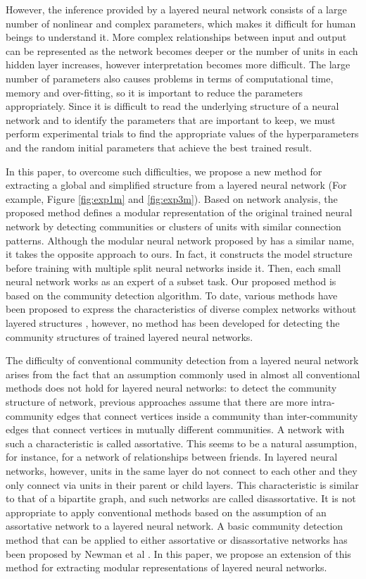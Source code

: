 \documentclass[12pt]{article} %
\begin{document}
However, the inference provided by a layered neural network consists of a large number of nonlinear and complex parameters, which makes it difficult for human beings to understand it. 
More complex relationships between input and output can be represented as the network becomes deeper or the number of units in each hidden layer increases, however interpretation becomes more difficult. The large number of parameters also causes problems in terms of computational time, memory and over-fitting, so it is important to reduce the parameters appropriately. 
Since it is difficult to read the underlying structure of a neural network and to identify the parameters that are important to keep, we must perform experimental trials to find the appropriate values of the hyperparameters and the random initial parameters that achieve the best trained result. 

In this paper, to overcome such difficulties, we propose a new method for extracting a global and simplified structure from a layered neural network (For example, Figure \ref{fig:exp1m} and \ref{fig:exp3m}). Based on network analysis, the proposed method defines a modular representation of the original trained neural network by detecting communities or clusters of units with similar connection patterns. 
Although the modular neural network proposed by \cite{Jacobs1991, Azam2000} has a similar name, it takes the opposite approach to ours. In fact, it constructs the model structure before training with multiple split neural networks inside it. Then, each small neural network works as an expert of a subset task. Our proposed method is based on the community detection algorithm. To date, various methods have been proposed to express the characteristics of diverse complex networks without layered structures \cite{Newman2004, Estrada2005, Newman2006, Meunier2006, Newman2007}, however, no method has been developed for detecting the community structures of trained layered neural networks. 

The difficulty of conventional community detection from a layered neural network arises from the fact that an assumption commonly used in almost all conventional methods does not hold for layered neural networks: to detect the community structure of network, previous approaches assume that there are more intra-community edges that connect vertices inside a community than inter-community edges that connect vertices in mutually different communities. A network with such a characteristic is called assortative. This seems to be a natural assumption, for instance, for a network of relationships between friends. In layered neural networks, however, units in the same layer do not connect to each other and they only connect via units in their parent or child layers. This characteristic is similar to that of a bipartite graph, and such networks are called disassortative. It is not appropriate to apply conventional methods based on the assumption of an assortative network to a layered neural network. A basic community detection method that can be applied to either assortative or disassortative networks has been proposed by Newman et al \cite{Newman2007}. In this paper, we propose an extension of this method for extracting modular representations of layered neural networks.
\end{document}
